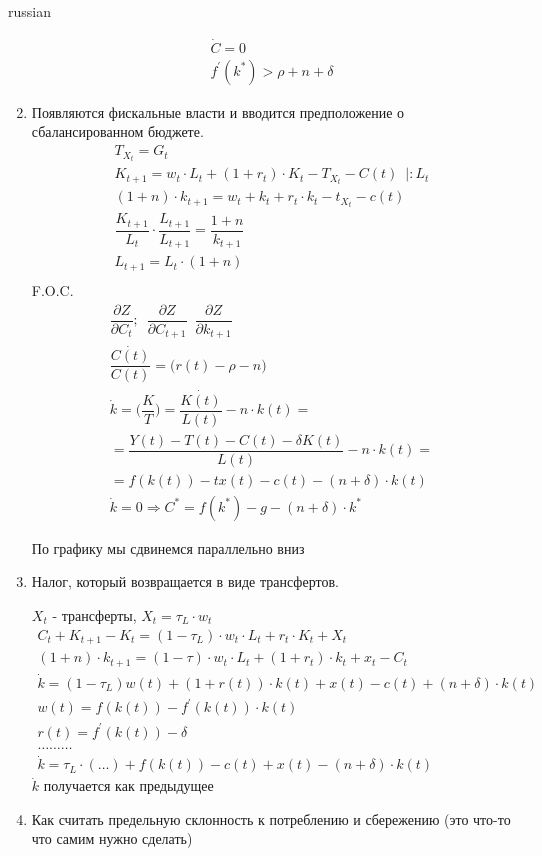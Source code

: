 \documentclass{article}
\begin{document}
\begin{otherlanguage*}{russian}
\begin{enumerate}
\begin{align*}
\dot{C} = 0 \\ 
f^{'} (k ^*) > \rho + n + \delta 
\end{align*}
\item Появляются фискальные власти и вводится предположение о сбалансированном бюджете. 
\begin{align*}
T_{X_t} = G_t \\ 
K_{t+1} = w_t \cdot L_t + (1 +  r_t) \cdot K_t -T_{X_t} - C (t)  \,\,\, | : L_t\\
(1 + n) \cdot k_{t+1} = w_t + k_t + r_t \cdot k_t - t_{X_t} - c(t) \\
\dfrac{K_{t+1}}{L_t} \cdot \dfrac{L_{t+1}}{L_{t+1}} = \dfrac{1 + n}{k_{t+1}} \\
L_{t+1} = L_t \cdot (1 + n) \\
\end{align*}
F.O.C. 
\begin{align*}
\dfrac{\partial Z}{\partial C_t}; \,\,\, \dfrac{\partial Z}{\partial C_{t+1}} \,\,\, \dfrac{\partial Z}{\partial k_{t+1}} \\
\dfrac{\dot{C(t)}}{C(t)} = \Big( r(t) - \rho - n \Big) \\
\dot{k} = \Big( \dfrac{K}{T}\Big) = \dfrac{\dot{K(t)}}{L(t)} - n \cdot k(t)= \\
= \dfrac{Y(t) - T(t) - C(t) - \delta K (t)}{L(t)} - n \cdot k (t) = \\ 
= f(k(t)) - tx (t) - c(t) - (n + \delta ) \cdot k(t) \\
\dot{k} = 0 \Rightarrow C^* = f(k^*) - g - (n + \delta ) \cdot k ^ * 
\end{align*}

По графику мы сдвинемся параллельно вниз 

\item Налог, который возвращается в виде трансфертов. 

$ X_t$ - трансферты, $ X_t = \tau_L \cdot w_t $ 
\begin{align*}
C_t + K_{t+1} - K_t = (1 - \tau_L) \cdot w_t \cdot L_t + r_t \cdot K_t + X_t \\ 
(1 + n) \cdot k_{t+1} = (1 - \tau) \cdot w_t \cdot L_t  + (1 + r_t) \cdot k_t + x_t - C_t \\ 
\dot{k} = (1 - \tau_L) w(t) + (1 + r(t)) \cdot k(t) + x(t) - c(t) + (n + \delta ) \cdot k(t) \\
w(t) = f(k(t)) - f ^{'} (k(t)) \cdot k(t) \\
r(t) = f^{'} (k(t)) - \delta \\ 
\ldots \ldots \ldots \\
\dot{k} = \tau_L \cdot (\ldots) + f(k(t)) - c(t) + x(t) - (n + \delta) \cdot k(t) 
\end{align*}
$ \dot{k} $ получается как предыдущее 


\item Как считать предельную склонность к потреблению и сбережению (это что-то что самим нужно сделать) 
\end{enumerate}
\end{otherlanguage*} 
\end{document}
